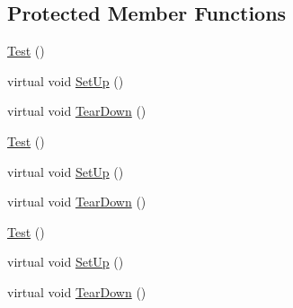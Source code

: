 \subsection*{Protected Member Functions}
\begin{DoxyCompactItemize}
\item 
\mbox{\hyperlink{classtesting_1_1_test_a99f2bbfac6c95612322b0f10e607ebe5}{Test}} ()
\item 
virtual void \mbox{\hyperlink{classtesting_1_1_test_a190315150c303ddf801313fd1a777733}{Set\+Up}} ()
\item 
virtual void \mbox{\hyperlink{classtesting_1_1_test_a5f0ab439802cbe0ef7552f1a9f791923}{Tear\+Down}} ()
\item 
\mbox{\hyperlink{classtesting_1_1_test_a68b7618abd1fc6d13382738b0d3b5c7c}{Test}} ()
\item 
virtual void \mbox{\hyperlink{classtesting_1_1_test_a8b38992669fb844864807cf32e416853}{Set\+Up}} ()
\item 
virtual void \mbox{\hyperlink{classtesting_1_1_test_aab3c02c9f81afe1357adfc45afccd474}{Tear\+Down}} ()
\item 
\mbox{\hyperlink{classtesting_1_1_test_a68b7618abd1fc6d13382738b0d3b5c7c}{Test}} ()
\item 
virtual void \mbox{\hyperlink{classtesting_1_1_test_a8b38992669fb844864807cf32e416853}{Set\+Up}} ()
\item 
virtual void \mbox{\hyperlink{classtesting_1_1_test_aab3c02c9f81afe1357adfc45afccd474}{Tear\+Down}} ()
\end{DoxyCompactItemize}
